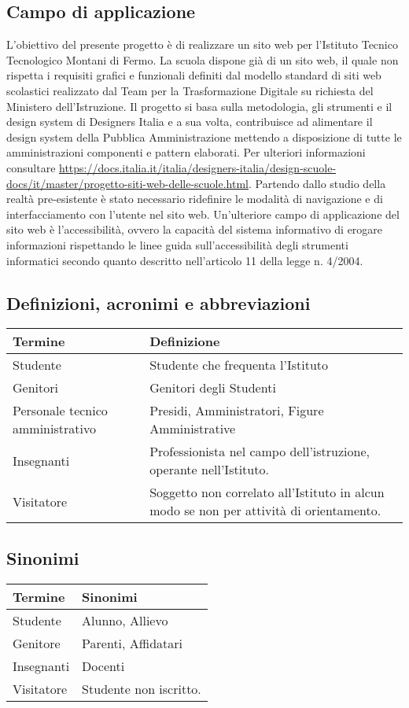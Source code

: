 \documentclass{article}
\begin{document}
	\subsection{\textbf{Campo di applicazione}}
	L'obiettivo del presente progetto è di realizzare un sito web per l'Istituto Tecnico Tecnologico Montani di Fermo. La scuola dispone già di un sito web, il quale non rispetta i requisiti grafici e funzionali definiti dal modello standard di siti web scolastici realizzato dal Team per la Trasformazione Digitale su richiesta del Ministero dell'Istruzione. Il progetto si basa sulla metodologia, gli strumenti e il design system di Designers Italia e a sua volta, contribuisce ad alimentare il design system della Pubblica Amministrazione mettendo a disposizione di tutte le amministrazioni componenti e pattern elaborati. Per ulteriori informazioni consultare \url{https://docs.italia.it/italia/designers-italia/design-scuole-docs/it/master/progetto-siti-web-delle-scuole.html}. Partendo dallo studio della realtà pre-esistente è stato necessario ridefinire le modalità di navigazione e di interfacciamento con l'utente nel sito web. Un'ulteriore campo di applicazione del sito web è l'accessibilità, ovvero la capacità del sistema informativo di erogare informazioni rispettando le linee guida sull’accessibilità degli strumenti informatici secondo quanto descritto nell’articolo 11 della legge n. 4/2004.
	
	
	\subsection{\textbf{Definizioni, acronimi e abbreviazioni}}
	\begin{tabular}{ |p{3cm}|p{8cm}|  }
	\hline
	\textbf{Termine}& \textbf{Definizione}\\
	\hline
	Studente   & Studente che frequenta l'Istituto  \\
	\hline
Genitori & Genitori degli Studenti \\
\hline
Personale tecnico amministrativo & Presidi, Amministratori, Figure Amministrative \\
	\hline
	Insegnanti   &  Professionista nel campo dell'istruzione, operante nell'Istituto.  \\
	\hline
	Visitatore  & Soggetto non correlato all'Istituto in alcun modo se non per attività di orientamento. \\	
	\hline
\end{tabular}
	
	\subsection{\textbf{Sinonimi}}
\begin{tabular}{ |p{3cm}|p{8cm}|  }
	\hline
	\textbf{Termine}& \textbf{Sinonimi}\\
	\hline
	Studente   & Alunno, Allievo  \\
	\hline
	Genitore   &  Parenti, Affidatari \\
	\hline
	Insegnanti  & Docenti\\	
	\hline
	Visitatore   & Studente non iscritto.  \\
	\hline
\end{tabular}
	
\end{document}
